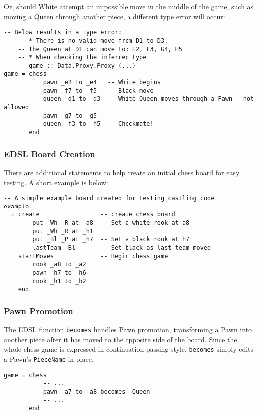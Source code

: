 \documentclass[12pt, a4paper]{scrartcl}
\begin{document}
Or, should White attempt an impossible move in the middle of the game, such as moving a Queen through another piece, a different type error will occur:

\begin{lstlisting}
-- Below results in a type error:
    -- * There is no valid move from D1 to D3.
    -- The Queen at D1 can move to: E2, F3, G4, H5
    -- * When checking the inferred type
    -- game :: Data.Proxy.Proxy (...)
game = chess
           pawn _e2 to _e4   -- White begins
           pawn _f7 to _f5   -- Black move
           queen _d1 to _d3  -- White Queen moves through a Pawn - not allowed
           pawn _g7 to _g5
           queen _f3 to _h5  -- Checkmate!
       end
\end{lstlisting}

\subsubsection{EDSL Board Creation}

There are additional statements to help create an initial chess board for easy testing. A short example is below:

\begin{lstlisting}
-- A simple example board created for testing castling code
example
  = create                 -- create chess board
        put _Wh _R at _a8  -- Set a white rook at a8
        put _Wh _R at _h1
        put _Bl _P at _h7  -- Set a black rook at h7
        lastTeam _Bl       -- Set black as last team moved
    startMoves             -- Begin chess game
        rook _a8 to _a2
        pawn _h7 to _h6
        rook _h1 to _h2
    end
\end{lstlisting}

\subsubsection{Pawn Promotion}

The EDSL function \lstinline{becomes} handles Pawn promotion, transforming a Pawn into another piece after it has moved to the opposite side of the board. Since the whole chess game is expressed in continuation-passing style, \lstinline{becomes} simply edits a Pawn's \lstinline{PieceName} in place.

\begin{lstlisting}
game = chess
           -- ...
           pawn _a7 to _a8 becomes _Queen
           -- ...
       end
\end{lstlisting}
\end{document}
